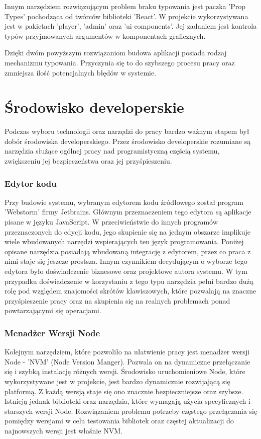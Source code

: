 Innym narzędziem rozwiązującym problem braku typowania jest paczka 'Prop Types' pochodząca od twórców biblioteki 'React'. W projekcie wykorzystywana jest w pakietach 'player', 'admin' oraz 'ui-components'. Jej zadaniem jest kontrola typów przyjmowanych argumentów w komponentach graficznych.

Dzięki dwóm powyższym rozwiązaniom budowa aplikacji posiada rodzaj mechanizmu typowania. Przyczynia się to do szybszego procesu pracy oraz zmniejsza ilość potencjalnych błędów w systemie.

\section{Środowisko developerskie}
Podczas wyboru technologii oraz narzędzi do pracy bardzo ważnym etapem był dobór środowiska developerskiego. Przez środowisko developerskie rozumiane są narzędzia służące ogólnej pracy nad programistyczną częścią systemu, zwiększeniu jej bezpieczeństwa oraz jej przyśpieszeniu.

\subsubsection{Edytor kodu}
Przy budowie systemu, wybranym edytorem kodu źródłowego został program 'Webstorm' firmy Jetbrains. Głównym przeznaczeniem tego edytora są aplikacje pisane w języku JavaScript. W przeciwieństwie do innych programów przeznaczonych do edycji kodu, jego skupienie się na jednym obszarze implikuje wiele wbudowanych narzędzi wspierających ten język programowania. Poniżej opisane narzędzia posiadają wbudowaną integrację z edytorem, przez co praca z nimi staje się jeszcze prostsza. Innym czynnikiem decydującym o wyborze tego edytora było doświadczenie biznesowe oraz projektowe autora systemu. W tym przypadku doświadczenie w korzystaniu z tego typu narzędzia pełni bardzo dużą rolę pod względem znajomości skrótów klawiszowych, które pozwalają na znaczne przyśpieszenie pracy oraz na skupienia się na realnych problemach ponad powtarzającymi się operacjami.


\subsubsection{Menadżer Wersji Node}
Kolejnym narzędziem, które pozwoliło na ułatwienie pracy jest menadżer wersji Node - 'NVM' (Node Version Manger).
Pozwala on na dynamiczne przełączanie się i szybką instalację różnych wersji. Środowisko uruchomieniowe Node, które wykorzystywane jest w projekcie, jest bardzo dynamicznie rozwijającą się platformą. Z każdą wersją staje się ono znacznie bezpieczniejsze oraz szybsze. Istnieją jednak biblioteki oraz narzędzia, które wymagają użycia specyficznych \newline i starszych wersji Node. Rozwiązaniem problemu potrzeby częstego przełączania się pomiędzy wersjami w celu testowania bibliotek oraz częstej aktualizacji do najnowszych wersji jest właśnie NVM. \cite{NVMDocs}

